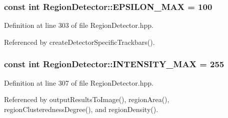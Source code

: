 \hypertarget{classmultiscale_1_1analysis_1_1RegionDetector_a724d57c0db65696f2ddab415deb1138d}{
\subsubsection[{\-E\-P\-S\-I\-L\-O\-N\-\_\-\-M\-A\-X}]{\setlength{\rightskip}{0pt plus 5cm}const int {\bf \-Region\-Detector\-::\-E\-P\-S\-I\-L\-O\-N\-\_\-\-M\-A\-X} = 100}}\label{classmultiscale_1_1analysis_1_1RegionDetector_a724d57c0db65696f2ddab415deb1138d}


\-Definition at line 303 of file \-Region\-Detector.\-hpp.



\-Referenced by create\-Detector\-Specific\-Trackbars().

\hypertarget{classmultiscale_1_1analysis_1_1RegionDetector_a3b682d43cd686a8bdfce91b0cbbf5245}{
\subsubsection[{\-I\-N\-T\-E\-N\-S\-I\-T\-Y\-\_\-\-M\-A\-X}]{\setlength{\rightskip}{0pt plus 5cm}const int {\bf \-Region\-Detector\-::\-I\-N\-T\-E\-N\-S\-I\-T\-Y\-\_\-\-M\-A\-X} = 255}}\label{classmultiscale_1_1analysis_1_1RegionDetector_a3b682d43cd686a8bdfce91b0cbbf5245}


\-Definition at line 307 of file \-Region\-Detector.\-hpp.



\-Referenced by output\-Results\-To\-Image(), region\-Area(), region\-Clusteredness\-Degree(), and region\-Density().

